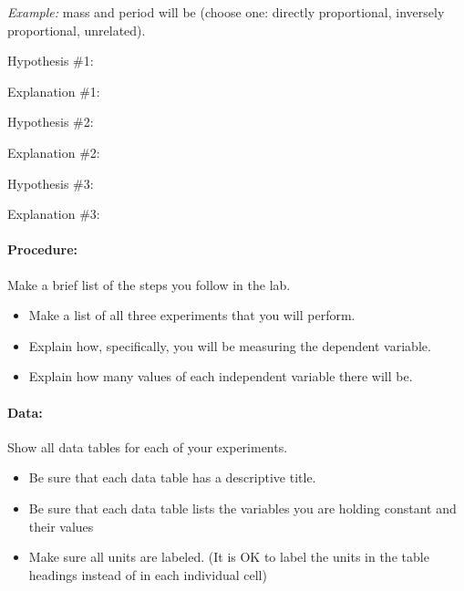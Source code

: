 \documentclass[10pt]{exam}
\begin{document}
  \emph{Example:} mass and period will be (choose one: directly proportional, inversely proportional, unrelated).
  \vspace{1em}

  Hypothesis \#1:\vspace{1em}

  Explanation \#1: \vspace{3em}

  Hypothesis \#2:\vspace{1em}

  Explanation \#2: \vspace{3em}

  Hypothesis \#3:\vspace{1em}

  Explanation \#3: \vspace{3em}

\pagebreak


\paragraph{Procedure:} 
  Make a brief list of the steps you follow in the lab.

  \begin{itemize}
    \item
      Make a list of all three experiments that you will perform.
    \item
      Explain how, specifically, you will be measuring the dependent variable.
    \item
      Explain how many values of each independent variable there will be.

  \end{itemize}

  \vs


\paragraph{Data:}
  Show all data tables for each of your experiments.

  \begin{itemize}
    \item
      Be sure that each data table has a descriptive title.
    \item
      Be sure that each data table lists the variables you are holding constant and their values
    \item
      Make sure all units are labeled. (It is OK to label the units in the table headings instead of in each individual cell)
  \end{itemize}
\end{document}

